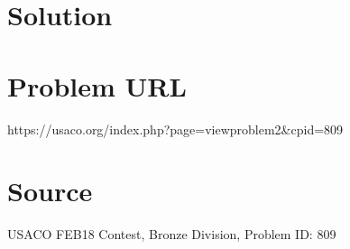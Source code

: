 \documentclass[12pt]{article}
\begin{document}
\section*{Solution}


\section*{Problem URL}
https://usaco.org/index.php?page=viewproblem2&cpid=809

\section*{Source}
USACO FEB18 Contest, Bronze Division, Problem ID: 809
\end{document}
